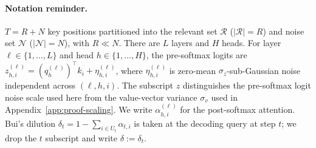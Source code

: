 \documentclass{article} %
\begin{document}
\paragraph{Notation reminder.}
$T = R + N$ key positions partitioned into the relevant set
$\mathcal{R}$ ($|\mathcal{R}| = R$) and noise set $\mathcal{N}$
($|\mathcal{N}| = N$), with $R \ll N$. There are $L$ layers and $H$
heads. For layer $\ell \in \{1, \dots, L\}$ and head $h \in \{1, \dots,
H\}$, the pre-softmax logits are $z^{(\ell)}_{h, i} = (q^{(\ell)}_h)^\top
k_i + \eta^{(\ell)}_{h, i}$, where $\eta^{(\ell)}_{h, i}$ is zero-mean
$\sigma_z$-sub-Gaussian noise independent across $(\ell, h, i)$. The
subscript $z$ distinguishes the pre-softmax logit noise scale used here
from the value-vector variance $\sigma_v$ used in
Appendix~\ref{app:proof-scaling}. We write $\alpha^{(\ell)}_{h, i}$ for
the post-softmax attention. Bui's dilution $\delta_t = 1 - \sum_{i \in
U_t} \alpha_{t, i}$ is taken at the decoding query at step $t$; we drop
the $t$ subscript and write $\delta := \delta_t$.
\end{document}
